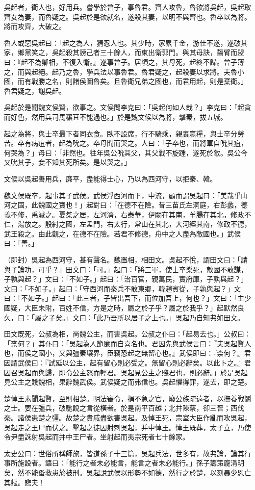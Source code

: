 \begin{pinyinscope}
吳起者，衛人也，好用兵。嘗學於曾子，事魯君。齊人攻魯，魯欲將吳起，吳起取齊女為妻，而魯疑之。吳起於是欲就名，遂殺其妻，以明不與齊也。魯卒以為將。將而攻齊，大破之。

魯人或惡吳起曰：「起之為人，猜忍人也。其少時，家累千金，游仕不遂，遂破其家，鄉黨笑之，吳起殺其謗己者三十餘人，而東出衛郭門。與其母訣，齧臂而盟曰：『起不為卿相，不復入衛。』遂事曾子。居頃之，其母死，起終不歸。曾子薄之，而與起絕。起乃之魯，學兵法以事魯君。魯君疑之，起殺妻以求將。夫魯小國，而有戰勝之名，則諸侯圖魯矣。且魯衛兄弟之國也，而君用起，則是棄衛。」魯君疑之，謝吳起。

吳起於是聞魏文侯賢，欲事之。文侯問李克曰：「吳起何如人哉？」李克曰：「起貪而好色，然用兵司馬穰苴不能過也。」於是魏文候以為將，擊秦，拔五城。

起之為將，與士卒最下者同衣食。臥不設席，行不騎乘，親裹贏糧，與士卒分勞苦。卒有病疽者，起為吮之。卒母聞而哭之。人曰：「子卒也，而將軍自吮其疽，何哭為？」母曰：「非然也。往年吳公吮其父，其父戰不旋踵，遂死於敵。吳公今又吮其子，妾不知其死所矣。是以哭之。」

文侯以吳起善用兵，廉平，盡能得士心，乃以為西河守，以拒秦、韓。

魏文侯既卒，起事其子武侯。武侯浮西河而下，中流，顧而謂吳起曰：「美哉乎山河之固，此魏國之寶也！」起對曰：「在德不在險。昔三苗氏左洞庭，右彭蠡，德義不修，禹滅之。夏桀之居，左河濟，右泰華，伊闕在其南，羊腸在其北，修政不仁，湯放之。殷紂之國，左孟門，右太行，常山在其北，大河經其南，修政不德，武王殺之。由此觀之，在德不在險。若君不修德，舟中之人盡為敵國也。」武侯曰：「善。」

（即封）吳起為西河守，甚有聲名。魏置相，相田文。吳起不悅，謂田文曰：「請與子論功，可乎？」田文曰：「可。」起曰：「將三軍，使士卒樂死，敵國不敢謀，子孰與起？」文曰：「不如子。」起曰：「治百官，親萬民，實府庫，子孰與起？」文曰：「不如子。」起曰：「守西河而秦兵不敢東鄉，韓趙賓從，子孰與起？」文曰：「不如子。」起曰：「此三者，子皆出吾下，而位加吾上，何也？」文曰：「主少國疑，大臣未附，百姓不信，方是之時，屬之於子乎？屬之於我乎？」起默然良久，曰：「屬之子矣。」文曰：「此乃吾所以居子之上也。」吳起乃自知弗如田文。

田文既死，公叔為相，尚魏公主，而害吳起。公叔之仆曰：「起易去也。」公叔曰：「柰何？」其仆曰：「吳起為人節廉而自喜名也。君因先與武侯言曰：『夫吳起賢人也，而侯之國小，又與彊秦壤界，臣竊恐起之無留心也。』武侯即曰：『柰何？』君因謂武侯曰：『試延以公主，起有留心則必受之。無留心則必辭矣。以此卜之。』君因召吳起而與歸，即令公主怒而輕君。吳起見公主之賤君也，則必辭。」於是吳起見公主之賤魏相，果辭魏武侯。武侯疑之而弗信也。吳起懼得罪，遂去，即之楚。

楚悼王素聞起賢，至則相楚。明法審令，捐不急之官，廢公族疏遠者，以撫養戰鬬之士。要在彊兵，破馳說之言從橫者。於是南平百越；北并陳蔡，卻三晉；西伐秦。諸侯患楚之彊。故楚之貴戚盡欲害吳起。及悼王死，宗室大臣作亂而攻吳起，吳起走之王尸而伏之。擊起之徒因射刺吳起，并中悼王。悼王既葬，太子立，乃使令尹盡誅射吳起而并中王尸者。坐射起而夷宗死者七十餘家。

太史公曰：世俗所稱師旅，皆道孫子十三篇，吳起兵法，世多有，故弗論，論其行事所施設者。語曰：「能行之者未必能言，能言之者未必能行。」孫子籌策龐涓明矣，然不能蚤救患於被刑。吳起說武侯以形勢不如德，然行之於楚，以刻暴少恩亡其軀。悲夫！


\end{pinyinscope}